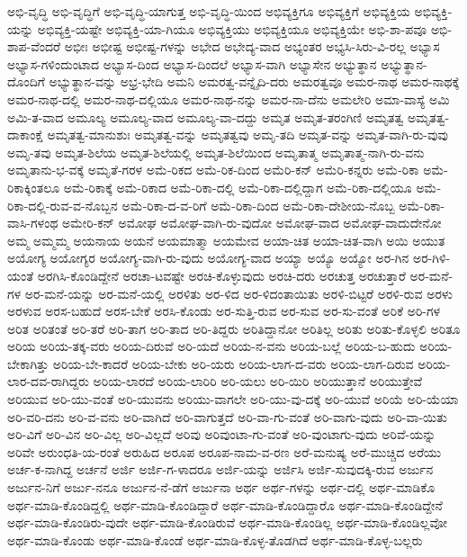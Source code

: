 ಅಭಿ-ವೃದ್ಧಿ
ಅಭಿ-ವೃದ್ಧಿಗೆ
ಅಭಿ-ವೃದ್ಧಿ-ಯಾಗುತ್ತ
ಅಭಿ-ವೃದ್ಧಿ-ಯಿಂದ
ಅಭಿವ್ಯಕ್ತಿಗೂ
ಅಭಿವ್ಯಕ್ತಿಗೆ
ಅಭಿವ್ಯಕ್ತಿಯ
ಅಭಿವ್ಯಕ್ತಿ-ಯನ್ನು
ಅಭಿವ್ಯಕ್ತಿ-ಯಷ್ಟೇ
ಅಭಿವ್ಯಕ್ತಿ-ಯಾ-ಗಿಯೂ
ಅಭಿವ್ಯಕ್ತಿಯು
ಅಭಿವ್ಯಕ್ತಿಯೂ
ಅಭಿವ್ಯಕ್ತಿಯೇ
ಅಭಿ-ಶಾ-ಪವೂ
ಅಭಿ-ಶಾಪ-ವೆಂದರೆ
ಅಭೀಃ
ಅಭೀಷ್ಟ
ಅಭೀಷ್ಟ-ಗಳನ್ನು
ಅಭೇದ
ಅಭೇದ್ಯ-ವಾದ
ಅಭ್ಯಂತರ
ಅಭ್ಯಸಿ-ಸಿರು-ವಿ-ರಲ್ಲ
ಅಭ್ಯಾಸ
ಅಭ್ಯಾಸ-ಗಳಿಂದುಂಟಾದ
ಅಭ್ಯಾಸ-ದಿಂದ
ಅಭ್ಯಾಸ-ದಿಂದಲೆ
ಅಭ್ಯಾಸ-ವಾಗಿ
ಅಭ್ಯಾಸೇನ
ಅಭ್ಯುತ್ಥಾನ
ಅಭ್ಯುತ್ಥಾನ-ದೊಂದಿಗೆ
ಅಭ್ಯುತ್ಥಾನ-ವನ್ನು
ಅಭ್ರ-ಭೇದಿ
ಅಮನಿ
ಅಮರತ್ವ-ವನ್ನೈದಿ-ದರು
ಅಮರತ್ವವೂ
ಅಮರ-ನಾಥ
ಅಮರ-ನಾಥಕ್ಕೆ
ಅಮರ-ನಾಥ-ದಲ್ಲಿ
ಅಮರ-ನಾಥ-ದಲ್ಲಿಯೂ
ಅಮರ-ನಾಥ-ನನ್ನು
ಅಮರ-ನಾ-ದೆನು
ಅಮಲೇರಿ
ಅಮಾ-ವಾಸ್ಯೆ
ಅಮಿ
ಅಮಿ-ತ-ವಾದ
ಅಮೂಲ್ಯ
ಅಮೂಲ್ಯ-ವಾದ
ಅಮೂಲ್ಯ-ವಾ-ದದ್ದು
ಅಮೃತ
ಅಮೃತ-ತರಂಗಿಣಿ
ಅಮೃತತ್ವ
ಅಮೃತತ್ವ-ದಾಕಾಂಕ್ಷೆ
ಅಮೃತತ್ವ-ಮಾನುಶುಃ
ಅಮೃತತ್ವ-ವನ್ನು
ಅಮೃತತ್ವವು
ಅಮೃ-ತದಿ
ಅಮೃತ-ವನ್ನು
ಅಮೃತ-ವಾಗಿ-ರು-ವುವು
ಅಮೃ-ತವು
ಅಮೃತ-ಶಿಲೆಯ
ಅಮೃತ-ಶಿಲೆಯಲ್ಲಿ
ಅಮೃತ-ಶಿಲೆಯಿಂದ
ಅಮೃತಾತ್ಮ
ಅಮೃತಾತ್ಮ-ನಾಗಿ-ರು-ವನು
ಅಮೃತಾನು-ಭ-ವಕ್ಕೆ
ಅಮೃತೆ-ಗರಳ
ಅಮೆ-ರಿಕದ
ಅಮೆ-ರಿಕ-ದಿಂದ
ಅಮೆರಿ-ಕನ್
ಅಮೆರಿ-ಕನ್ನರು
ಅಮೆ-ರಿಕಾ
ಅಮೆ-ರಿಕಾಕ್ಕಿಂತಲೂ
ಅಮೆ-ರಿಕಾಕ್ಕೆ
ಅಮೆ-ರಿಕಾದ
ಅಮೆ-ರಿಕಾ-ದಲ್ಲಿ
ಅಮೆ-ರಿಕಾ-ದಲ್ಲಿದ್ದಾಗ
ಅಮೆ-ರಿಕಾ-ದಲ್ಲಿಯೂ
ಅಮೆ-ರಿಕಾ-ದಲ್ಲಿ-ರುವ-ವ-ನೊಬ್ಬನ
ಅಮೆ-ರಿಕಾ-ದ-ವ-ರಿಗೆ
ಅಮೆ-ರಿಕಾ-ದಿಂದ
ಅಮೆ-ರಿಕಾ-ದೇಶೀಯ-ನೊಬ್ಬ
ಅಮೆ-ರಿಕಾ-ವಾಸಿ-ಗಳಂಥ
ಅಮೇರಿ-ಕನ್
ಅಮೋಘ
ಅಮೋಘ-ವಾಗಿ-ರು-ವುದೋ
ಅಮೋಘ-ವಾದ
ಅಮೋಘ-ವಾದುದೇನೋ
ಅಮ್ಮ
ಅಮ್ಮಮ್ಮ
ಅಯನಾಯ
ಅಯನೆ
ಅಯಮಾತ್ಮಾ
ಅಯಮೇವ
ಅಯಾ-ಚಿತ
ಅಯಾ-ಚಿತ-ವಾಗಿ
ಅಯಿ
ಅಯುತ
ಅಯೋಗ್ಯ
ಅಯೋಗ್ಯರ
ಅಯೋಗ್ಯ-ವಾಗಿ-ರು-ವುದು
ಅಯೋಗ್ಯ-ವಾದ
ಅಯ್ಯಾ
ಅಯ್ಯೊ
ಅಯ್ಯೋ
ಅರ-ಗಿನ
ಅರ-ಗಿಳಿ-ಯಂತೆ
ಅರಗಿಸಿ-ಕೊಂಡಿದ್ದೇನೆ
ಅರಚಾ-ಟವಷ್ಟೇ
ಅರಚಿ-ಕೊಳ್ಳುವುದು
ಅರಚಿ-ದರು
ಅರಚುತ್ತ
ಅರಚುತ್ತಾರೆ
ಅರ-ಮನೆ-ಗಳ
ಅರ-ಮನೆ-ಯನ್ನು
ಅರ-ಮನೆ-ಯಲ್ಲಿ
ಅರಳಿತು
ಅರ-ಳಿದ
ಅರ-ಳಿದಂತಾಯಿತು
ಅರಳಿ-ಬಿಟ್ಟರೆ
ಅರಳಿ-ರುವ
ಅರಳು
ಅರಳುವ
ಅರಸ-ಬಹುದೆ
ಅರಸ-ಬೇಕೆ
ಅರಸಿ-ಕೊಂಡು
ಅರ-ಸುತ್ತಿ-ರುವ
ಅರ-ಸುವ
ಅರ-ಸು-ವಂತೆ
ಅರಿಕೆ
ಅರಿ-ಗಳ
ಅರಿತ
ಅರಿತಂತೆ
ಅರಿ-ತರೆ
ಅರಿ-ತಾಗ
ಅರಿ-ತಾದ
ಅರಿ-ತಿದ್ದರು
ಅರಿತಿದ್ದಾನೋ
ಅರಿತಿಲ್ಲ
ಅರಿತು
ಅರಿತು-ಕೊಳ್ಳಲಿ
ಅರಿತೂ
ಅರಿಯ
ಅರಿಯ-ತಕ್ಕ-ವರು
ಅರಿಯ-ದಿರುವೆ
ಅರಿ-ಯದೆ
ಅರಿಯ-ನ-ವನು
ಅರಿಯ-ಬಲ್ಲೆ
ಅರಿಯ-ಬ-ಹುದು
ಅರಿಯ-ಬೇಕಾಗಿತ್ತು
ಅರಿಯ-ಬೇ-ಕಾದರೆ
ಅರಿಯ-ಬೇಕು
ಅರಿ-ಯರು
ಅರಿಯ-ಲಾಗ-ದ-ವರು
ಅರಿಯ-ಲಾಗ-ದಿರುವ
ಅರಿಯ-ಲಾರ-ದವ-ರಾಗಿದ್ದರು
ಅರಿಯ-ಲಾರದೆ
ಅರಿಯ-ಲಾರಿರಿ
ಅರಿ-ಯಲು
ಅರಿ-ಯಿರಿ
ಅರಿಯುತ್ತಾನೆ
ಅರಿಯುತ್ತೇವೆ
ಅರಿಯುವ
ಅರಿ-ಯು-ವಂತೆ
ಅರಿ-ಯುವನು
ಅರಿಯು-ವಾಗಲೇ
ಅರಿ-ಯು-ವು-ದಕ್ಕೆ
ಅರಿ-ಯುವೆ
ಅರಿಯೆ
ಅರಿ-ಯೆಯಾ
ಅರಿ-ವರಿ-ದನು
ಅರಿ-ವ-ವನು
ಅರಿ-ವಾಗಿದೆ
ಅರಿ-ವಾಗುತ್ತದೆ
ಅರಿ-ವಾ-ಗು-ವಂತೆ
ಅರಿ-ವಾಗು-ವುದು
ಅರಿ-ವಾ-ಯಿತು
ಅರಿ-ವಿಗೆ
ಅರಿ-ವಿನ
ಅರಿ-ವಿಲ್ಲ
ಅರಿ-ವಿಲ್ಲದೆ
ಅರಿವು
ಅರಿವುಂಟಾ-ಗು-ವಂತೆ
ಅರಿ-ವುಂಟಾಗು-ವುದು
ಅರಿವೆ-ಯನ್ನು
ಅರಿವೇ
ಅರುಂಧತಿ-ಯ-ರಂತೆ
ಅರುಹಿದ
ಅರೂಪ
ಅರೂಪ-ನಾಮ-ವ-ರಣ
ಅರೆ-ಮನುಷ್ಯ
ಅರೆ-ಮುಚ್ಚಿದ
ಅರೆಯು
ಅರ್ಚ-ಕ-ನಾಗಿದ್ದ
ಅರ್ಚನೆ
ಅರ್ಜಿ
ಅರ್ಜಿ-ಗ-ಳಾದರೂ
ಅರ್ಜಿ-ಯನ್ನು
ಅರ್ಜಿಸಿ
ಅರ್ಜಿ-ಸುವುದಕ್ಕಿ-ರುವ
ಅರ್ಜುನ
ಅರ್ಜುನ-ನಿಗೆ
ಅರ್ಜು-ನನೂ
ಅರ್ಜುನ-ನೆ-ಡೆಗೆ
ಅರ್ಜುನಾ
ಅರ್ಥ
ಅರ್ಥ-ಗಳನ್ನು
ಅರ್ಥ-ದಲ್ಲಿ
ಅರ್ಥ-ಮಾಡಿಕೊ
ಅರ್ಥ-ಮಾಡಿ-ಕೊಂಡಿದ್ದಲ್ಲಿ
ಅರ್ಥ-ಮಾಡಿ-ಕೊಂಡಿದ್ದಾರೆ
ಅರ್ಥ-ಮಾಡಿ-ಕೊಂಡಿದ್ದಾರೊ
ಅರ್ಥ-ಮಾಡಿ-ಕೊಂಡಿದ್ದೇನೆ
ಅರ್ಥ-ಮಾಡಿ-ಕೊಂಡಿರು-ವುದೇ
ಅರ್ಥ-ಮಾಡಿ-ಕೊಂಡಿರುವೆ
ಅರ್ಥ-ಮಾಡಿ-ಕೊಂಡಿಲ್ಲ
ಅರ್ಥ-ಮಾಡಿ-ಕೊಂಡಿಲ್ಲವೋ
ಅರ್ಥ-ಮಾಡಿ-ಕೊಂಡು
ಅರ್ಥ-ಮಾಡಿ-ಕೊಂಡೆ
ಅರ್ಥ-ಮಾಡಿ-ಕೊಳ್ಳ-ತೊಡಗಿದೆ
ಅರ್ಥ-ಮಾಡಿ-ಕೊಳ್ಳ-ಬಲ್ಲರು

